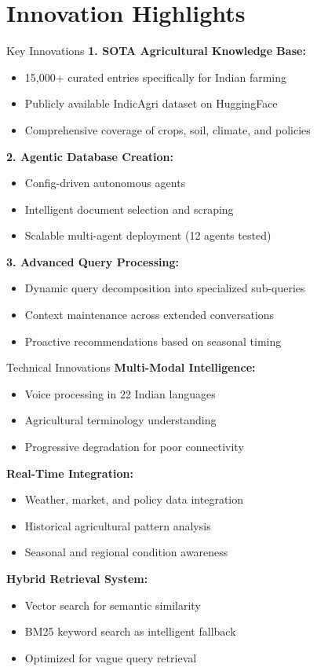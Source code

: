\documentclass[aspectratio=169]{beamer}
\begin{document}
\section{Innovation Highlights}

\begin{frame}{Key Innovations}
\textbf{1. SOTA Agricultural Knowledge Base:}
\begin{itemize}
\item 15,000+ curated entries specifically for Indian farming
\item Publicly available IndicAgri dataset on HuggingFace
\item Comprehensive coverage of crops, soil, climate, and policies
\end{itemize}

\textbf{2. Agentic Database Creation:}
\begin{itemize}
\item Config-driven autonomous agents
\item Intelligent document selection and scraping
\item Scalable multi-agent deployment (12 agents tested)
\end{itemize}

\textbf{3. Advanced Query Processing:}
\begin{itemize}
\item Dynamic query decomposition into specialized sub-queries
\item Context maintenance across extended conversations
\item Proactive recommendations based on seasonal timing
\end{itemize}
\end{frame}

\begin{frame}{Technical Innovations}
\textbf{Multi-Modal Intelligence:}
\begin{itemize}
\item Voice processing in 22 Indian languages
\item Agricultural terminology understanding
\item Progressive degradation for poor connectivity
\end{itemize}

\textbf{Real-Time Integration:}
\begin{itemize}
\item Weather, market, and policy data integration
\item Historical agricultural pattern analysis
\item Seasonal and regional condition awareness
\end{itemize}

\textbf{Hybrid Retrieval System:}
\begin{itemize}
\item Vector search for semantic similarity
\item BM25 keyword search as intelligent fallback
\item Optimized for vague query retrieval
\end{itemize}
\end{frame}
\end{document}
